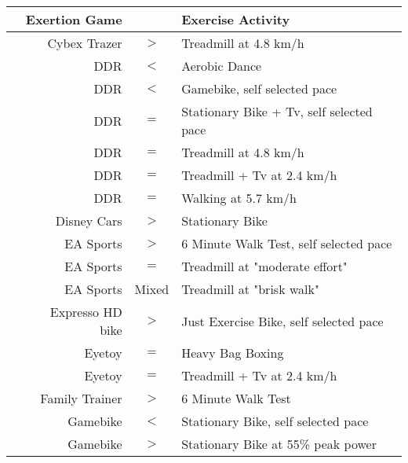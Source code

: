 
{
\setlength{\tabcolsep}{1pt}
\begin{tabular}{lrcl}
\hline
& \multicolumn{1}{r}{\textbf{Exertion Game}}
 & & \multicolumn{1}{l}{\textbf{Exercise Activity}}
 \\
\hline

\cite{Bailey2011EnergyExergaming}&Cybex Trazer&\cellcolor{green!30}$>$&Treadmill at 4.8 km/h\\
\cite{Gao2013ChildrenSDance}&DDR&\cellcolor{red!30}$<$&Aerobic Dance\\
\cite{Kraft2011HeartParticipants}&DDR&\cellcolor{red!30}$<$&Gamebike, self selected pace\\
\cite{Kraft2011HeartParticipants}&DDR&\cellcolor{yellow!30}$=$&Stationary Bike + Tv, self selected pace\\
\cite{Bailey2011EnergyExergaming}&DDR&\cellcolor{yellow!30}$=$&Treadmill at 4.8 km/h\\
\cite{LanninghamFoster2006EnergyChildren}&DDR&\cellcolor{yellow!30}$=$&Treadmill + Tv at 2.4 km/h\\
\cite{Graf2009PlayingChildren}&DDR&\cellcolor{yellow!30}$=$&Walking at 5.7 km/h\\
\cite{Haddock_2009}&Disney Cars&\cellcolor{green!30}$>$&Stationary Bike\\
\cite{delCorral2014PhysiologicalCf}&EA Sports&\cellcolor{green!30}$>$&6 Minute Walk Test, self selected pace\\
\cite{Legear2016DoesCopd}&EA Sports&\cellcolor{yellow!30}$=$&Treadmill at "moderate effort"\\
\cite{Perron2012ComparisonAdults}&EA Sports&\cellcolor{black!20}Mixed&Treadmill at "brisk walk"\\
\cite{Glen2017ExergamingHarder}&Expresso HD bike&\cellcolor{green!30}$>$&Just Exercise Bike, self selected pace\\
\cite{Matrosly2017ExergamingInjury}&Eyetoy&\cellcolor{yellow!30}$=$&Heavy Bag Boxing\\
\cite{LanninghamFoster2006EnergyChildren}&Eyetoy&\cellcolor{yellow!30}$=$&Treadmill + Tv at 2.4 km/h\\
\cite{delCorral2014PhysiologicalCf}&Family Trainer&\cellcolor{green!30}$>$&6 Minute Walk Test\\
\cite{Pasco2017TheMotivation}&Gamebike&\cellcolor{red!30}$<$&Stationary Bike, self selected pace\\
\cite{Monedero2015InteractiveAdults}&Gamebike&\cellcolor{green!30}$>$&Stationary Bike at 55\% peak power\\

\end{tabular}}
